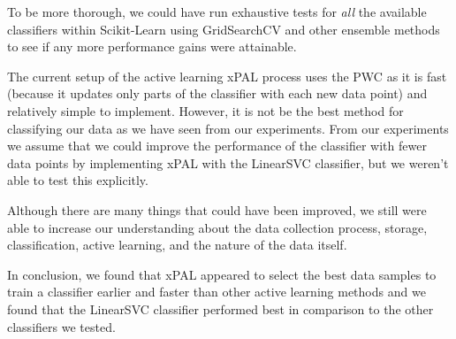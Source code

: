 
To be more thorough, we could have run exhaustive tests for \textit{all} the available classifiers within Scikit-Learn using GridSearchCV and other ensemble methods to see if any more performance gains were attainable. 

The current setup of the active learning xPAL process uses the PWC as it is fast (because it updates only parts of the classifier with each new data point) and relatively simple to implement. However, it is not be the best method for classifying our data as we have seen from our experiments. From our experiments we assume that we could improve the performance of the classifier with fewer data points by implementing xPAL with the LinearSVC classifier, but we weren't able to test this explicitly.

Although there are many things that could have been improved, we still were able to increase our understanding about the data collection process, storage, classification, active learning, and the nature of the data itself. 

In conclusion, we found that xPAL appeared to select the best data samples to train a classifier earlier and faster than other active learning methods and we found that the LinearSVC classifier performed best in comparison to the other classifiers we tested.
